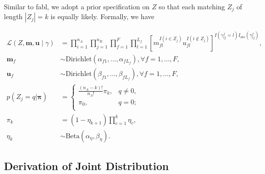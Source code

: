 \documentclass[12pt,letterpaper]{article}
\newcommand{\1}[1]{\mathbb{I}\!\left[#1\right]} %
\begin{document}
Similar to fabl, we adopt a prior specification on $Z$ so that each matching $Z_j$ of length $|Z_j| = k$ is equally likely. Formally, we have

\begin{subequations}
	\begin{align}
		\mathcal{L}(Z, \bm{m}, \bm{u} \mid \gamma) &= \prod_{i=1}^{n_A}  \prod_{j=1}^{n_B}\prod_{f=1}^{F}\prod_{l=1}^{L_f}\left[  m_{fl}^{I(i \in Z_j)}u_{fl}^{I(i \notin Z_j)}\right]^{I(\gamma_{ij}^f = l)I_{obs}(\gamma_{ij}^f)}, \label{eqn:likelihood}\\
		\bm{m}_f &\sim \text{Dirichlet}(\alpha_{f1}, \ldots, \alpha_{f L_f}), \forall f = 1, \ldots, F, \label{eqn:m} \\
		\bm{u}_f &\sim \text{Dirichlet}(\beta_{f1}, \ldots, \beta_{f L_f}),\forall f = 1, \ldots, F,  \label{eqn:u}\\
		p(Z_j = q| \bm{\pi})  &=
		\begin{cases} 
			\frac{(n_A - k)!}{n_A!} \pi_k,  & q \neq 0, \\
			\pi_0, &  q  = 0; \\
		\end{cases} \label{eqn:z}\\
		\pi_k &= (1 - \eta_{k+1}) \prod_{c=1}^{k} \eta_c,  \\
		\eta_k &\sim \text{Beta}(\alpha_{\eta}, \beta_{\eta})\label{eqn:pi}.
	\end{align}
\end{subequations}



\subsection{Derivation of Joint Distribution}
\end{document}
